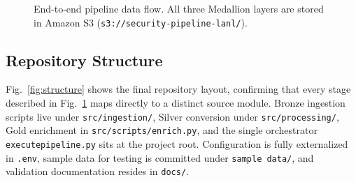 \documentclass[conference]{IEEEtran}
\begin{document}
\begin{figure}[htbp]
\centering
{}
\caption{End-to-end pipeline data flow. All three Medallion layers are stored in Amazon S3 (\texttt{s3://security-pipeline-lanl/}).}
\label{fig:arch}
\end{figure}

\subsection{Repository Structure}

Fig.~\ref{fig:structure} shows the final repository layout, confirming
that every stage described in Fig.~\ref{fig:arch} maps directly to a
distinct source module. Bronze ingestion scripts live under
\texttt{src/ingestion/}, Silver conversion under \texttt{src/processing/},
Gold enrichment in \texttt{src/scripts/enrich.py}, and the single
orchestrator \texttt{executepipeline.py} sits at the project root.
Configuration is fully externalized in \texttt{.env}, sample data for
testing is committed under \texttt{sample data/}, and validation
documentation resides in \texttt{docs/}.
\end{document}
